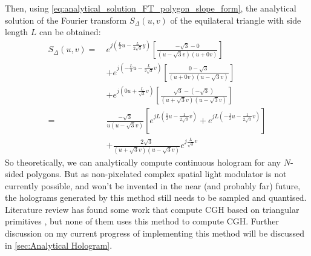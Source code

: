 Then, using \cref{eq:analytical_solution_FT_polygon_slope_form}, the analytical solution of the Fourier transform $S_\Delta(u,v)$ of the equilateral triangle with side length $L$ can be obtained:
\begin{align}
  S_\Delta(u,v)  =\  & e^{j(\frac{L}{2}u - \frac{L}{2\sqrt{3}}y)} \left[\frac{-\sqrt{3} - 0}{(u-\sqrt{3}v)(u + 0v)}\right]  \nonumber                                     \\
                     & +                e^{j(-\frac{L}{2}u - \frac{L}{2\sqrt{3}}v)} \left[\frac{0 - \sqrt{3}}{(u + 0v)(u - \sqrt{3}v)}\right] \nonumber                   \\
                     & +                e^{j(0u + \frac{L}{\sqrt{3}}v)} \left[\frac{\sqrt{3} - (-\sqrt{3})}{(u + \sqrt{3}v)(u - \sqrt{3}v)}\right]                        \\
  =\                 & \frac{-\sqrt{3}}{u(u-\sqrt{3}v)}\left[e^{jL(\frac{1}{2}u - \frac{1}{2\sqrt{3}}v)} + e^{jL(-\frac{1}{2}u - \frac{1}{2\sqrt{3}}v)}\right]  \nonumber \\
                     & +                 \frac{2\sqrt{3}}{(u+\sqrt{3}v)(u-\sqrt{3}v)} e^{j\frac{L}{\sqrt{3}}v}
\end{align}
So theoretically, we can analytically compute continuous hologram for any $N$-sided polygons. But as non-pixelated complex spatial light modulator is not currently possible, and won't be invented in the near (and probably far) future, the holograms generated by this method still needs to be sampled and quantised. Literature review has found some work that compute CGH based on triangular primitives \cite{Pan2013, Maranville2021, Zhang2022}, but none of them uses this method to compute CGH. Further discussion on my current progress of implementing this method will be discussed in \cref{sec:Analytical Hologram}.